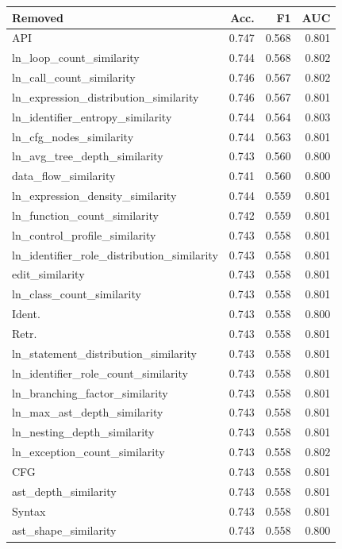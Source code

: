 \begin{table}[!htbp]
\centering
\scriptsize
\begin{tabular}{lrrr}
\toprule
Removed & Acc. & F1 & AUC \\
\midrule
API & 0.747 & 0.568 & 0.801 \\
ln\_loop\_count\_similarity & 0.744 & 0.568 & 0.802 \\
ln\_call\_count\_similarity & 0.746 & 0.567 & 0.802 \\
ln\_expression\_distribution\_similarity & 0.746 & 0.567 & 0.801 \\
ln\_identifier\_entropy\_similarity & 0.744 & 0.564 & 0.803 \\
ln\_cfg\_nodes\_similarity & 0.744 & 0.563 & 0.801 \\
ln\_avg\_tree\_depth\_similarity & 0.743 & 0.560 & 0.800 \\
data\_flow\_similarity & 0.741 & 0.560 & 0.800 \\
ln\_expression\_density\_similarity & 0.744 & 0.559 & 0.801 \\
ln\_function\_count\_similarity & 0.742 & 0.559 & 0.801 \\
ln\_control\_profile\_similarity & 0.743 & 0.558 & 0.801 \\
ln\_identifier\_role\_distribution\_similarity & 0.743 & 0.558 & 0.801 \\
edit\_similarity & 0.743 & 0.558 & 0.801 \\
ln\_class\_count\_similarity & 0.743 & 0.558 & 0.801 \\
Ident. & 0.743 & 0.558 & 0.800 \\
Retr. & 0.743 & 0.558 & 0.801 \\
ln\_statement\_distribution\_similarity & 0.743 & 0.558 & 0.801 \\
ln\_identifier\_role\_count\_similarity & 0.743 & 0.558 & 0.801 \\
ln\_branching\_factor\_similarity & 0.743 & 0.558 & 0.801 \\
ln\_max\_ast\_depth\_similarity & 0.743 & 0.558 & 0.801 \\
ln\_nesting\_depth\_similarity & 0.743 & 0.558 & 0.801 \\
ln\_exception\_count\_similarity & 0.743 & 0.558 & 0.802 \\
CFG & 0.743 & 0.558 & 0.801 \\
ast\_depth\_similarity & 0.743 & 0.558 & 0.801 \\
Syntax & 0.743 & 0.558 & 0.801 \\
ast\_shape\_similarity & 0.743 & 0.558 & 0.800 \\

\end{tabular}
\end{table}
